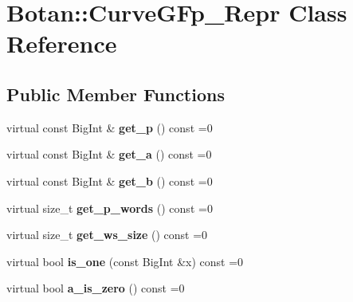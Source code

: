 \hypertarget{class_botan_1_1_curve_g_fp___repr}{}\section{Botan\+:\+:Curve\+G\+Fp\+\_\+\+Repr Class Reference}
\label{class_botan_1_1_curve_g_fp___repr}
\subsection*{Public Member Functions}
\begin{DoxyCompactItemize}
\item 
\mbox{\label{class_botan_1_1_curve_g_fp___repr_a5283d6ce7777ecd822642a49e199553f}} 
virtual const Big\+Int \& {\bfseries get\+\_\+p} () const =0
\item 
\mbox{\label{class_botan_1_1_curve_g_fp___repr_a8f53d51746e65f3c0bc06b064ee1cfba}} 
virtual const Big\+Int \& {\bfseries get\+\_\+a} () const =0
\item 
\mbox{\label{class_botan_1_1_curve_g_fp___repr_a0025b7a4c139ed73eda44e2ccb0e437a}} 
virtual const Big\+Int \& {\bfseries get\+\_\+b} () const =0
\item 
\mbox{\label{class_botan_1_1_curve_g_fp___repr_a422fd941a25baa78a8ccb96cf89fb4e2}} 
virtual size\+\_\+t {\bfseries get\+\_\+p\+\_\+words} () const =0
\item 
\mbox{\label{class_botan_1_1_curve_g_fp___repr_aba211a492792b6065b118a96d012ffb1}} 
virtual size\+\_\+t {\bfseries get\+\_\+ws\+\_\+size} () const =0
\item 
\mbox{\label{class_botan_1_1_curve_g_fp___repr_a77c1586210218584b9fdfdc20096f737}} 
virtual bool {\bfseries is\+\_\+one} (const Big\+Int \&x) const =0
\item 
\mbox{\label{class_botan_1_1_curve_g_fp___repr_afc7f4e0795d2f48061e292e80d1d3868}} 
virtual bool {\bfseries a\+\_\+is\+\_\+zero} () const =0
\item 

\end{DoxyCompactItemize}
